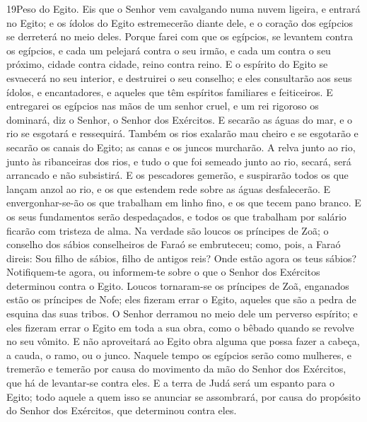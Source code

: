 \medskip

\lettrine{19}{}Peso do Egito. Eis que o Senhor vem cavalgando
numa nuvem ligeira, e entrará no Egito; e os ídolos do Egito
estremecerão diante dele, e o coração dos egípcios se derreterá no
meio deles. Porque farei com que os egípcios, se levantem contra
os egípcios, e cada um pelejará contra o seu irmão, e cada um contra
o seu próximo, cidade contra cidade, reino contra reino. E o
espírito do Egito se esvaecerá no seu interior, e destruirei o seu
conselho; e eles consultarão aos seus ídolos, e encantadores, e
aqueles que têm espíritos familiares e feiticeiros. E entregarei
os egípcios nas mãos de um senhor cruel, e um rei rigoroso os
dominará, diz o Senhor, o Senhor dos Exércitos. E secarão as
águas do mar, e o rio se esgotará e ressequirá. Também os rios
exalarão mau cheiro e se esgotarão e secarão os canais do Egito; as
canas e os juncos murcharão. A relva junto ao rio, junto às
ribanceiras dos rios, e tudo o que foi semeado junto ao rio, secará,
será arrancado e não subsistirá. E os pescadores gemerão, e
suspirarão todos os que lançam anzol ao rio, e os que estendem rede
sobre as águas desfalecerão. E envergonhar-se-ão os que
trabalham em linho fino, e os que tecem pano branco. E os
seus fundamentos serão despedaçados, e todos os que trabalham por
salário ficarão com tristeza de alma. Na verdade são loucos
os príncipes de Zoã; o conselho dos sábios conselheiros de Faraó se
embruteceu; como, pois, a Faraó direis: Sou filho de sábios, filho
de antigos reis? Onde estão agora os teus sábios?
Notifiquem-te agora, ou informem-te sobre o que o Senhor dos
Exércitos determinou contra o Egito. Loucos tornaram-se os
príncipes de Zoã, enganados estão os príncipes de Nofe; eles fizeram
errar o Egito, aqueles que são a pedra de esquina das suas tribos.
O Senhor derramou no meio dele um perverso espírito; e eles
fizeram errar o Egito em toda a sua obra, como o bêbado quando se
revolve no seu vômito. E não aproveitará ao Egito obra alguma
que possa fazer a cabeça, a cauda, o ramo, ou o junco.
Naquele tempo os egípcios serão como mulheres, e tremerão e
temerão por causa do movimento da mão do Senhor dos Exércitos, que
há de levantar-se contra eles. E a terra de Judá será um
espanto para o Egito; todo aquele a quem isso se anunciar se
assombrará, por causa do propósito do Senhor dos Exércitos, que
determinou contra eles.

